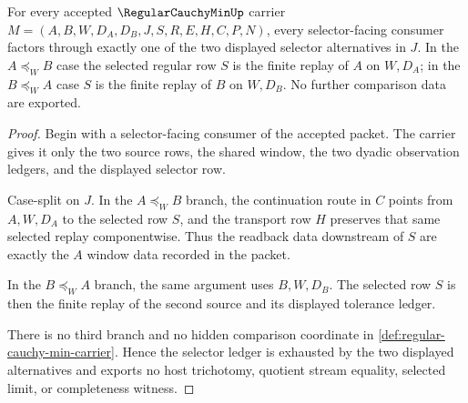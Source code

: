 \begin{theorem}
\label{thm:regular-cauchy-min-selector-ledger}
For every accepted $\RegularCauchyMinUp$ carrier $M=(A,B,W,D_A,D_B,J,S,R,E,H,C,P,N)$, every selector-facing consumer factors through exactly one of the two displayed selector alternatives in $J$. In the $A \preceq_W B$ case the selected regular row $S$ is the finite replay of $A$ on $W,D_A$; in the $B \preceq_W A$ case $S$ is the finite replay of $B$ on $W,D_B$. No further comparison data are exported.
\end{theorem}
\begin{proof}
Begin with a selector-facing consumer of the accepted packet. The carrier gives it only the two source rows, the shared window, the two dyadic observation ledgers, and the displayed selector row.

Case-split on $J$. In the $A \preceq_W B$ branch, the continuation route in $C$ points from $A,W,D_A$ to the selected row $S$, and the transport row $H$ preserves that same selected replay componentwise. Thus the readback data downstream of $S$ are exactly the $A$ window data recorded in the packet.

In the $B \preceq_W A$ branch, the same argument uses $B,W,D_B$. The selected row $S$ is then the finite replay of the second source and its displayed tolerance ledger.

There is no third branch and no hidden comparison coordinate in \autoref{def:regular-cauchy-min-carrier}. Hence the selector ledger is exhausted by the two displayed alternatives and exports no host trichotomy, quotient stream equality, selected limit, or completeness witness.
\end{proof}

